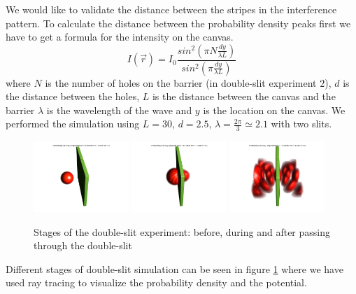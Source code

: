 We would like to validate the distance between the stripes in the interference pattern.
To calculate the distance between the probability density peaks first we have to get a formula for the intensity on the canvas.
\begin{equation}
	\label{eq:Huygens}
	I(\vec{r}) = I_0 \frac{sin^2\left( \pi N \frac{dy}{\lambda L} \right)}{sin^2\left( \pi \frac{dy}{\lambda L} \right)}
\end{equation}
where $N$ is the number of holes on the barrier (in double-slit experiment $2$), $d$ is the distance between the holes, $L$ is the distance between the canvas and the barrier $\lambda$ is the wavelength of the wave and $y$ is the location on the canvas.
We performed the simulation using $L = 30$, $d = 2.5$, $\lambda = \frac{2\pi}{3}\simeq 2.1$ with two slits.
\begin{figure}
	\begin{center}
		\includegraphics[width=0.32\textwidth]{figures/double_slit_01.png}
		\includegraphics[width=0.32\textwidth]{figures/double_slit_02.png}
		\includegraphics[width=0.32\textwidth]{figures/double_slit_03.png}
		\caption{Stages of the double-slit experiment: before, during and after passing through the double-slit}
		\label{fig:double_slit_stages}
	\end{center}
\end{figure}
Different stages of double-slit simulation can be seen in figure \ref{fig:double_slit_stages} where we have used ray tracing to visualize the probability density and the potential.
